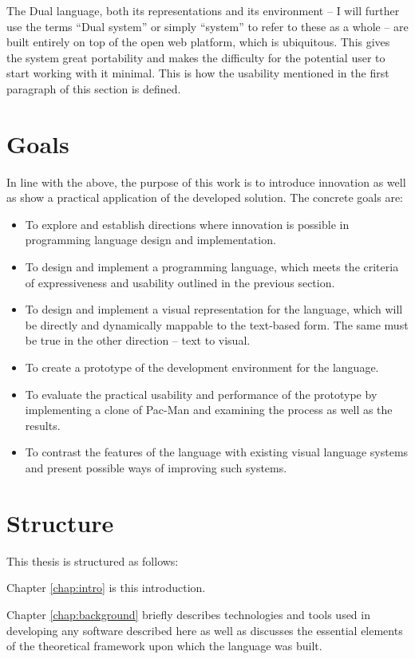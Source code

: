 The Dual language, both its representations and its environment -- I will further use the terms ``Dual system'' or simply ``system'' to refer to these as a whole -- are built entirely on top of the open web platform\cite{open_web_platform}, which is ubiquitous. This gives the system great portability and makes the difficulty for the potential user to start working with it minimal. This is how the usability mentioned in the first paragraph of this section is defined.

\section{Goals}
In line with the above, the purpose of this work is to introduce innovation as well as show a practical application of the developed solution. The concrete goals are:
\begin{itemize}
	\item To explore and establish directions where innovation is possible in programming language design and implementation.
	\item To design and implement a programming language, which meets the criteria of expressiveness and usability outlined in the previous section.
    \item To design and implement a visual representation for the language, which will be directly and dynamically mappable to the text-based form. The same must be true in the other direction -- text to visual.
	\item To create a prototype of the development environment for the language.
    \item To evaluate the practical usability and performance of the prototype by implementing a clone of Pac-Man and examining the process as well as the results.
    \item To contrast the features of the language with existing visual language systems and present possible ways of improving such systems.
\end{itemize}

\section{Structure}
This thesis is structured as follows:

Chapter \ref{chap:intro} is this introduction.

Chapter \ref{chap:background} briefly describes technologies and tools used in developing any software described here as well as discusses the essential elements of the theoretical framework upon which the language was built.

